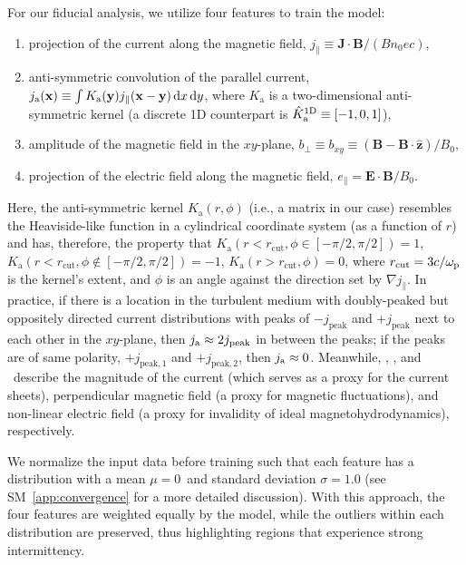 For our fiducial analysis, we utilize four features to train the model:
\begin{enumerate}
    \item projection of the current along the magnetic field, $j_\parallel \equiv \mathbf{J}\cdot \mathbf{B}/(B n_0 e c)$,
    \item anti-symmetric convolution of the parallel current, $j_\mathrm{a} (\mathbf{x}) \equiv \int K_\mathrm{a}(\mathbf{y}) j_\parallel (\mathbf{x} - \mathbf{y}) \,\mathrm{d} x \, \mathrm{d} y$, where $K_\mathrm{a}$ is a two-dimensional anti-symmetric kernel (a discrete 1D counterpart is $\hat{K}_\mathrm{a}^{1\rm D} \equiv [-1, 0, 1]$),
    \item amplitude of the magnetic field in the $xy$-plane, $b_{\perp} \equiv b_{xy} \equiv (\mathbf{B} - \mathbf{B} \cdot \mathbf{\hat{z}})/B_0$,
    \item projection of the electric field along the magnetic field, $e_\parallel = \mathbf{E}\cdot\mathbf{B}/B_0$.
\end{enumerate}
Here, the anti-symmetric kernel $K_\mathrm{a}(r,\phi)$ (i.e., a matrix in our case) resembles the Heaviside-like function in a cylindrical coordinate system (as a function of $r$) and has, therefore, the property that
$K_\mathrm{a}(r < r_\mathrm{cut}, \phi \in [-\pi/2,\pi/2]) = 1$,
$K_\mathrm{a}(r < r_\mathrm{cut}, \phi \not\in [-\pi/2, \pi/2]) = -1$,
$K_\mathrm{a}(r > r_\mathrm{cut}, \phi) = 0$,
where $r_\mathrm{cut} = 3 c/\omega_{\rm p}$ is the kernel's extent, and $\phi$ is an angle against the direction set by $\nabla j_{\parallel}$.
In practice, if there is a location in the turbulent medium with doubly-peaked but oppositely directed current distributions with peaks of $-j_\mathrm{peak}$ and $+j_\mathrm{peak}$ next to each other in the $xy$-plane, then $j_{\rm a} \approx 2 j_\mathrm{peak}$ in between the peaks;
if the peaks are of same polarity, $+j_{\mathrm{peak},1}$ and $+j_{\mathrm{peak},2}$, then $j_{\rm a} \approx 0$.
Meanwhile, \jpar, \bperp, and \epar\ describe the magnitude of the current (which serves as a proxy for the current sheets), perpendicular magnetic field (a proxy for magnetic fluctuations), and non-linear electric field (a proxy for invalidity of ideal magnetohydrodynamics), respectively.

We normalize the input data before training such that each feature has a distribution with a mean $\mu = 0$\ and standard deviation $\sigma = 1.0$ (see SM~\ref{app:convergence} for a more detailed discussion).
With this approach, the four features are weighted equally by the model, while the outliers within each distribution are preserved, thus highlighting regions that experience strong intermittency.

